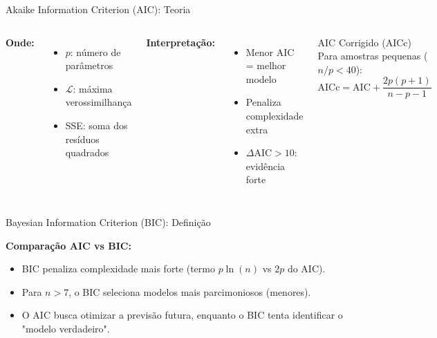 \begin{frame}{Akaike Information Criterion (AIC): Teoria}


\begin{columns}
\textbf{Onde:}
\begin{itemize}\scriptsize
    \item $p$: número de parâmetros
    \item $\mathcal{L}$: máxima verossimilhança
    \item SSE: soma dos resíduos quadrados
\end{itemize}

\vspace{0.1cm}
\textbf{Interpretação:}
\begin{itemize}\scriptsize
    \item Menor AIC = melhor modelo
    \item Penaliza complexidade extra
    \item $\Delta\text{AIC} > 10$: evidência forte
\end{itemize}

\begin{exampleblock}{AIC Corrigido (AICc)}\small
Para amostras pequenas ($n/p < 40$):
\begin{equation*}
\text{AICc} = \text{AIC} + \frac{2p(p+1)}{n-p-1}
\end{equation*}
\end{exampleblock}
\end{columns}
\end{frame}

\begin{frame}{Bayesian Information Criterion (BIC): Definição}


\textbf{Comparação AIC vs BIC:}
\begin{itemize}\small
    \item BIC penaliza complexidade mais forte (termo $p\ln(n)$ vs $2p$ do AIC).
    \item Para $n > 7$, o BIC seleciona modelos mais parcimoniosos (menores).
    \item O AIC busca otimizar a previsão futura, enquanto o BIC tenta identificar o "modelo verdadeiro".
\end{itemize}
\end{frame}

